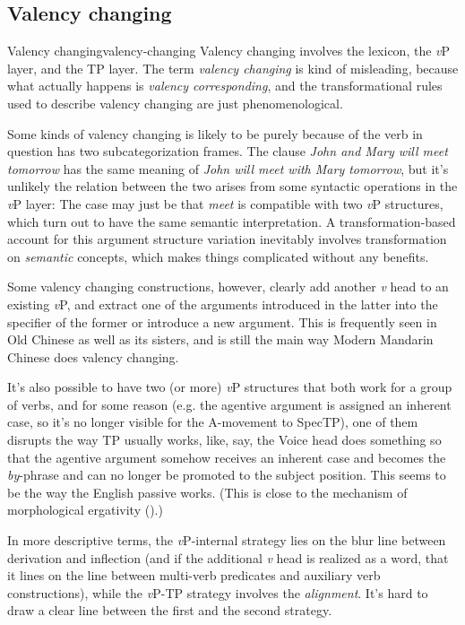 \documentclass[UTF8, a4paper, oneside, scheme=plain]{ctexrep}
\newcommand*{\term}[1]{\emph{#1}}
\newcommand{\corpus}[1]{\emph{#1}}
\newcommand{\vP}{\textit{v}P}
\begin{document}
\subsection{Valency changing}\label{sec:overview.valency-changing}

\begin{theorybox}{Valency changing}{valency-changing}
    Valency changing involves the lexicon, the \vP{} layer, and the TP layer.
    The term \term{valency changing} is kind of misleading,
    because what actually happens is \emph{valency corresponding},
    and the transformational rules used to describe valency changing 
    are just phenomenological.

    Some kinds of valency changing is likely to be purely because of 
    the verb in question has two subcategorization frames.
    The clause \corpus{John and Mary will meet tomorrow} 
    has the same meaning of \corpus{John will meet with Mary tomorrow},
    but it's unlikely the relation between the two arises from some syntactic operations in the \vP{} layer:
    The case may just be that \corpus{meet} is compatible with two \vP{} structures,
    which turn out to have the same semantic interpretation.
    A transformation-based account for this argument structure variation 
    inevitably involves transformation on \emph{semantic} concepts,
    which makes things complicated without any benefits.

    Some valency changing constructions, however, clearly add another \term{v} head to an existing \vP{},
    and extract one of the arguments introduced in the latter into the specifier of the former
    or introduce a new argument.
    This is frequently seen in Old Chinese as well as its sisters,
    and is still the main way Modern Mandarin Chinese does valency changing.

    It's also possible to have two (or more) \vP{} structures that both work for a group of verbs,
    and for some reason (e.g. the agentive argument is assigned an inherent case, 
    so it's no longer visible for the A-movement to SpecTP),
    one of them disrupts the way TP usually works,
    like, say, the Voice head does something 
    so that the agentive argument somehow receives an inherent case 
    and becomes the \corpus{by}-phrase and can no longer be promoted to the subject position.
    This seems to be the way the English passive works.
    (This is close to the mechanism of morphological ergativity ().)

    In more descriptive terms,
    the \vP-internal strategy lies on the blur line between derivation and inflection
    (and if the additional \term{v} head is realized as a word, 
    that it lines on the line between multi-verb predicates and auxiliary verb constructions),
    while the \vP-TP strategy involves the \emph{alignment}.
    It's hard to draw a clear line between the first and the second strategy.
\end{theorybox}
\end{document}
